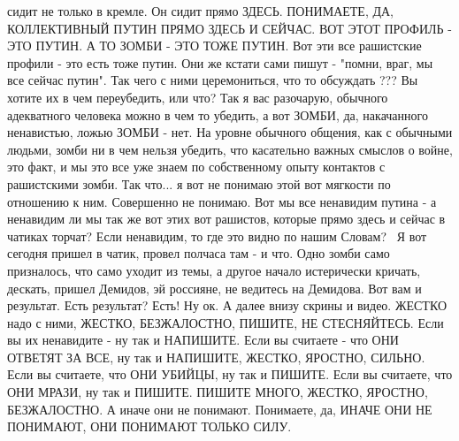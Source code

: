 сидит не только в кремле. Он сидит прямо ЗДЕСЬ. ПОНИМАЕТЕ, ДА, КОЛЛЕКТИВНЫЙ
ПУТИН ПРЯМО ЗДЕСЬ И СЕЙЧАС. ВОТ ЭТОТ ПРОФИЛЬ - ЭТО ПУТИН. А ТО ЗОМБИ - ЭТО ТОЖЕ
ПУТИН. Вот эти все рашистские профили - это есть тоже путин. Они же кстати сами
пишут - "помни, враг, мы все сейчас путин". Так чего с ними церемониться, что
то обсуждать ??? Вы хотите их в чем переубедить, или что? Так я вас разочарую,
обычного адекватного человека можно в чем то убедить, а вот ЗОМБИ, да,
накачанного ненавистью, ложью ЗОМБИ - нет. На уровне обычного общения, как с
обычными людьми, зомби ни в чем нельзя убедить, что касательно важных смыслов о
войне, это факт, и мы это все уже знаем по собственному опыту контактов с
рашистскими зомби.  Так что... я вот не понимаю этой вот мягкости по отношению
к ним. Совершенно не понимаю. Вот мы все ненавидим путина - а ненавидим ли мы
так же вот этих вот рашистов, которые прямо здесь и сейчас в чатиках торчат?
Если ненавидим, то где это видно по нашим Словам?  Я вот сегодня пришел в
чатик, провел полчаса там - и что. Одно зомби само призналось, что само уходит
из темы, а другое начало истерически кричать, дескать, пришел Демидов, эй
россияне, не ведитесь на Демидова. Вот вам и результат. Есть результат? Есть!
Ну ок. А далее внизу скрины и видео. ЖЕСТКО надо с ними, ЖЕСТКО, БЕЗЖАЛОСТНО,
ПИШИТЕ, НЕ СТЕСНЯЙТЕСЬ. Если вы их ненавидите - ну так и НАПИШИТЕ. Если вы
считаете - что ОНИ ОТВЕТЯТ ЗА ВСЕ, ну так и НАПИШИТЕ, ЖЕСТКО, ЯРОСТНО, СИЛЬНО.
Если вы считаете, что ОНИ УБИЙЦЫ, ну так и ПИШИТЕ. Если вы считаете, что ОНИ
МРАЗИ, ну так и ПИШИТЕ. ПИШИТЕ МНОГО, ЖЕСТКО, ЯРОСТНО, БЕЗЖАЛОСТНО. А иначе они
не понимают. Понимаете, да, ИНАЧЕ ОНИ НЕ ПОНИМАЮТ, ОНИ ПОНИМАЮТ ТОЛЬКО СИЛУ.
